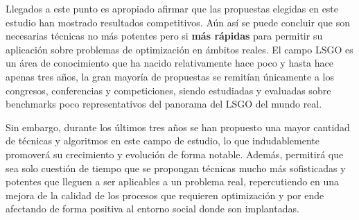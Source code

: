 Llegados a este punto es apropiado afirmar que las propuestas elegidas en este estudio han mostrado resultados competitivos. Aún así se puede concluir que son necesarias técnicas no más potentes pero si \textbf{más rápidas} para permitir su aplicación sobre problemas de optimización en ámbitos reales. El campo LSGO es un área de conocimiento que ha nacido relativamente hace poco y hasta hace apenas tres años, la gran mayoría de propuestas se remitían únicamente a los congresos, conferencias y competiciones, siendo estudiadas y evaluadas sobre benchmarks poco representativos del panorama del LSGO del mundo real. 

Sin embargo, durante los últimos tres años se han propuesto una mayor cantidad de técnicas y algoritmos en este campo de estudio, lo que indudablemente promoverá su crecimiento y evolución de forma notable. Además, permitirá que sea solo cuestión de tiempo que se propongan técnicas mucho más sofisticadas y potentes que lleguen a ser aplicables a un problema real, repercutiendo en una mejora de la calidad de los procesos que requieren optimización y por ende afectando de forma positiva al entorno social donde son implantadas.












